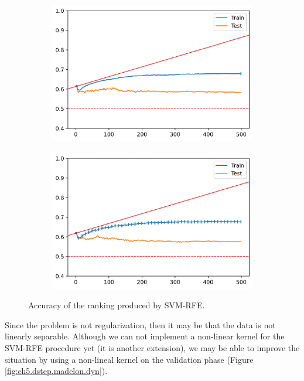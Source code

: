 \begin{figure}[h]
    \centering
    \begin{subfigure}[b]{0.4\linewidth}
        \includegraphics[width=\linewidth]{img/ch5/dstep/madelon-lin1.png}
    \end{subfigure}
    \begin{subfigure}[b]{0.4\linewidth}
        \includegraphics[width=\linewidth]{img/ch5/dstep/madelon-lin2.png}
    \end{subfigure}
    \caption[Dynamic step: Madelon with constant step]{Accuracy of the ranking produced by SVM-RFE.}
    \label{fig:ch5.dstep.madelon.lin}
\end{figure}

Since the problem is not regularization, then it may be that the data is not linearly separable. Although we can not implement a non-linear kernel for the SVM-RFE procedure yet (it is another extension), we may be able to improve the situation by using a non-lineal kernel on the validation phase (Figure \ref{fig:ch5.dstep.madelon.dyn}).

